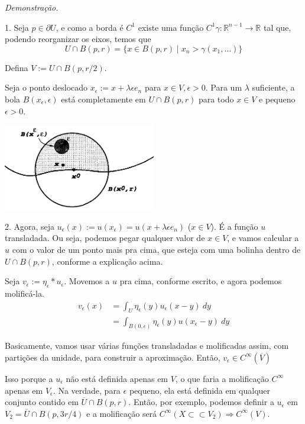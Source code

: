 \documentclass[11pt]{article}
\newcommand{\R}{\mathbb{R}}
\newcommand{\e}{\epsilon}
\newcommand{\pu}{\partial U}
\begin{document}
\textit{Demonstração.} 

1. Seja \( p \in \pu  \), e como a borda é \( C^1 \) existe uma função \( C^1 \gamma:\R^{n-1}\rightarrow \R\) tal que, podendo reorganizar os eixos, temos que \[ U \cap B(p,r) = \{ x \in B(p,r) \mid x_n > \gamma(x_1, \ldots)\} \]

Defina \( V:= U \cap B(p, r/2) \).

Seja o ponto deslocado \( x_\e := x + \lambda\e e_n \) para \( x \in V, \e>0 \). Para um \( \lambda \) suficiente, a bola \( B(x_\e, \e) \) está completamente em \( U \cap B(p,r) \) para todo \( x \in V \) e pequeno \( \e>0 \).

\begin{center}
	\includegraphics[width=0.5\textwidth]{Imagens/SobolevAproximaçãoGlobal.png}
\end{center}


2. Agora, seja \( u_\e(x) := u(x_\e) = u(x + \lambda\e e_n ) \) (\( x \in V \)). É a função \( u \) transladada. Ou seja, podemos pegar qualquer valor de \( x \in V \), e vamos calcular a \( u \) com o valor de um ponto mais pra cima, que esteja com uma bolinha dentro de \( U \cap B(p,r) \), conforme a explicação acima.

Seja \( v_\e :=  \eta_\e * u_\e \). Movemos a \( u \) pra cima, conforme escrito, e agora podemos molificá-la.\begin{align*}
	v_\e(x) &= \int_U \eta_\e(y) u_\e (x-y)\ dy\\
	&= \int_{B(0,\e)} \eta_\e(y) u(x_\e -y)\ dy
\end{align*}

Basicamente, vamos usar várias funções transladadas e molificadas assim, com partições da unidade, para construir a aproximação. Então, \( v_\e \in C^\infty(\overline{V}) \)

Isso porque a $u_\e$ não está definida apenas em $V$, o que faria a molificação $ C^\infty $ apenas em $V_\e$. Na verdade, para $\e$ pequeno, ela está definida em qualquer conjunto contido em $\overline{U} \cap B(p,r)$. Então, por exemplo, podemos definir a $u_\e$ em $V_2  = \overline{U} \cap B(p, 3r/4)$ e a molificação será $C^\infty(X \subset\subset V_2) \Rightarrow C^\infty(V)$.
\end{document}
